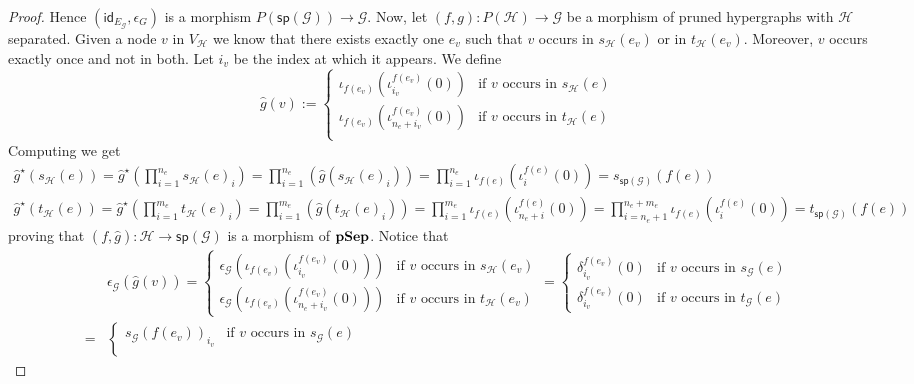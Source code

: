 \documentclass[3p]{elsarticle}
\newcommand{\catname}[1]{\textbf{\textup{#1}}}
\newcommand{\pshyp}{\catname{pSep}}
\renewcommand{\sp}{\mathsf{sp}}
\newcommand{\id}[1]{\mathsf{id}_{#1}}
\theoremstyle{remark}
\theoremstyle{definition}
\begin{document}
\begin{proof}
	\smallskip 
	Hence $(\id{E_{\mathcal{G}}}, \epsilon_{G})$ is a morphism $P(\sp(\mathcal{G}))\to \mathcal{G}$. Now, let $(f,g)\colon P(\mathcal{H})\to \mathcal{G}$ be a  morphism of pruned hypergraphs with $\mathcal{H}$ separated. Given a node $v$ in $V_{\mathcal{H}}$ we know that there exists exactly one $e_v$ such that $v$ occurs in $s_{\mathcal{H}}(e_v)$ or in $t_{\mathcal{H}}(e_v)$. Moreover, $v$ occurs exactly once and not in both. Let $i_v$ be the index at which it appears. We define
	\[\hat{g}(v):=\begin{cases}
		\iota_{f(e_v)}(\iota^{f(e_v)}_{i_v}(0)) & \text{if } v \text{ occurs in } s_{\mathcal{H}}(e)\\
		\iota_{f(e_v)}(\iota^{f(e_v)}_{n_e + i_v}(0)) & \text{if } v \text{ occurs in } t_{\mathcal{H}}(e)\\
	\end{cases}\]
	Computing we get
	\begin{gather*}
		\hat{g}^\star(s_{\mathcal{H}}(e))= \hat{g}^\star(\prod_{i=1}^{n_e} s_{\mathcal{H}}(e)_i)=\prod_{i=1}^{n_e}(\hat{g}(s_{\mathcal{H}}(e)_i))=\prod_{i=1}^{n_e}\iota_{f(e)}( \iota^{f(e)}_i(0))=s_{\sp(\mathcal{G})}(f(e))\\
		\hat{g}^\star(t_{\mathcal{H}}(e))= \hat{g}^\star(\prod_{i=1}^{m_e} t_{\mathcal{H}}(e)_i)=\prod_{i=1}^{m_e}(\hat{g}(t_{\mathcal{H}}(e)_i))=\prod_{i=1}^{m_e}\iota_{f(e)}( \iota^{f(e)}_{n_e+i}(0))=\prod_{i=n_e + 1}^{n_e + m_e}\iota_{f(e)}( \iota^{f(e)}_{i}(0))=t_{\sp(\mathcal{G})}(f(e))
	\end{gather*}
	proving that $(f, \hat{g})\colon \mathcal{H}\to\sp( \mathcal{G})$ is a morphism of $\pshyp$. Notice that	
	\begin{align*}
		&\epsilon_\mathcal{G}(\hat{g}(v))=\begin{cases}
			\epsilon_\mathcal{G}(\iota_{f(e_v)}(\iota^{f(e_v)}_{i_v}(0))) & \text{if } v \text{ occurs in } s_{\mathcal{H}}(e_v)\\
			\epsilon_\mathcal{G}(\iota_{f(e_v)}(\iota^{f(e_v)}_{n_e + i_v}(0))) & \text{if }v \text{ occurs in } t_{\mathcal{H}}(e_v)
		\end{cases}=	\begin{cases}
		\delta^{f(e_v)}_{i_v}(0)& \text{if }v \text{ occurs in } s_{\mathcal{G}}(e)\\
		\delta^{f(e_v)}_{i_v}(0)& \text{if } v \text{ occurs in } t_{\mathcal{G}}(e)
		\end{cases}\\ =&
		\begin{cases}
			s_{\mathcal{G}}(f(e_v))_{i_v}& \text{if } v \text{ occurs in } s_{\mathcal{G}}(e)\\

\end{cases}
\end{align*}
\end{proof}
\end{document}
